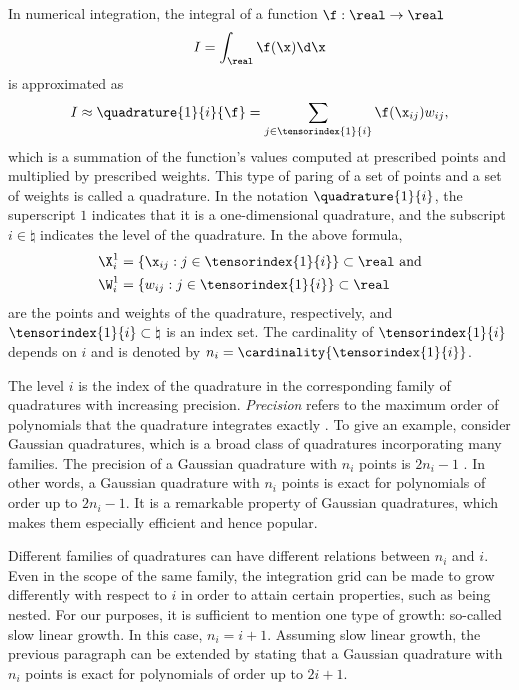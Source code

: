 In numerical integration, the integral of a function $\f: \real \to \real$
\[
  I = \int_\real \f(\x) \d \x
\]
is approximated as
\[
  I \approx \quadrature{1}{i}{\f}
  = \sum_{j \in \tensorindex{1}{i}} \f(\x_{ij}) w_{ij},
\]
which is a summation of the function's values computed at prescribed points and
multiplied by prescribed weights. This type of paring of a set of points and a
set of weights is called a quadrature. In the notation $\quadrature{1}{i}$, the
superscript $1$ indicates that it is a one-dimensional quadrature, and the
subscript $i \in \natural$ indicates the level of the quadrature. In the above
formula,
\begin{align*}
  & \X^1_i = \{ \x_{ij}: j \in \tensorindex{1}{i} \} \subset \real \text{ and} \\
  & \W^1_i = \{ w_{ij}: j \in \tensorindex{1}{i} \} \subset \real
\end{align*}
are the points and weights of the quadrature, respectively, and
$\tensorindex{1}{i} \subset \natural$ is an index set. The cardinality of
$\tensorindex{1}{i}$ depends on $i$ and is denoted by $n_i =
\cardinality{\tensorindex{1}{i}}$.

The level $i$ is the index of the quadrature in the corresponding family of
quadratures with increasing precision. \emph{Precision} refers to the maximum
order of polynomials that the quadrature integrates exactly \cite{heiss2008}. To
give an example, consider Gaussian quadratures, which is a broad class of
quadratures incorporating many families. The precision of a Gaussian quadrature
with $n_i$ points is $2 n_i - 1$ \cite{heiss2008}. In other words, a Gaussian
quadrature with $n_i$ points is exact for polynomials of order up to $2 n_i -
1$. It is a remarkable property of Gaussian quadratures, which makes them
especially efficient and hence popular.

Different families of quadratures can have different relations between $n_i$ and
$i$. Even in the scope of the same family, the integration grid can be made to
grow differently with respect to $i$ in order to attain certain properties, such
as being nested. For our purposes, it is sufficient to mention one type of
growth: so-called slow linear growth. In this case, $n_i = i + 1$. Assuming slow
linear growth, the previous paragraph can be extended by stating that a Gaussian
quadrature with $n_i$ points is exact for polynomials of order up to $2 i + 1$.

